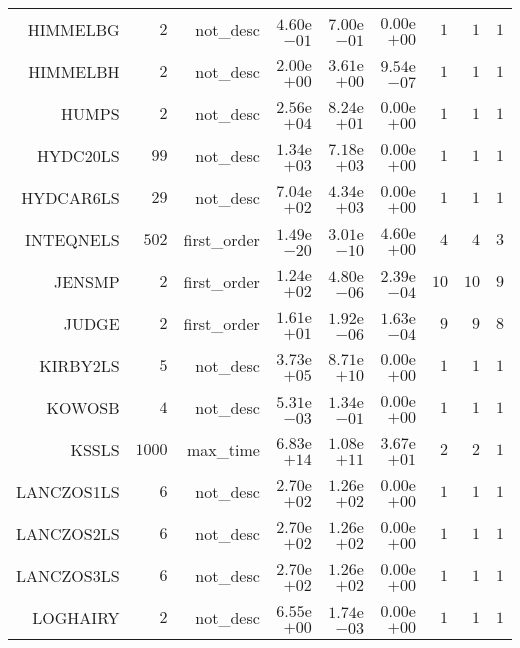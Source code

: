 \begin{longtable}{rrrrrrrrr}
HIMMELBG & \(     2\) & not\_desc & \( 4.60\)e\(-01\) & \( 7.00\)e\(-01\) & \( 0.00\)e\(+00\) & \(     1\) & \(     1\) & \(     1\) \\
HIMMELBH & \(     2\) & not\_desc & \( 2.00\)e\(+00\) & \( 3.61\)e\(+00\) & \( 9.54\)e\(-07\) & \(     1\) & \(     1\) & \(     1\) \\
HUMPS & \(     2\) & not\_desc & \( 2.56\)e\(+04\) & \( 8.24\)e\(+01\) & \( 0.00\)e\(+00\) & \(     1\) & \(     1\) & \(     1\) \\
HYDC20LS & \(    99\) & not\_desc & \( 1.34\)e\(+03\) & \( 7.18\)e\(+03\) & \( 0.00\)e\(+00\) & \(     1\) & \(     1\) & \(     1\) \\
HYDCAR6LS & \(    29\) & not\_desc & \( 7.04\)e\(+02\) & \( 4.34\)e\(+03\) & \( 0.00\)e\(+00\) & \(     1\) & \(     1\) & \(     1\) \\
INTEQNELS & \(   502\) & first\_order & \( 1.49\)e\(-20\) & \( 3.01\)e\(-10\) & \( 4.60\)e\(+00\) & \(     4\) & \(     4\) & \(     3\) \\
JENSMP & \(     2\) & first\_order & \( 1.24\)e\(+02\) & \( 4.80\)e\(-06\) & \( 2.39\)e\(-04\) & \(    10\) & \(    10\) & \(     9\) \\
JUDGE & \(     2\) & first\_order & \( 1.61\)e\(+01\) & \( 1.92\)e\(-06\) & \( 1.63\)e\(-04\) & \(     9\) & \(     9\) & \(     8\) \\
KIRBY2LS & \(     5\) & not\_desc & \( 3.73\)e\(+05\) & \( 8.71\)e\(+10\) & \( 0.00\)e\(+00\) & \(     1\) & \(     1\) & \(     1\) \\
KOWOSB & \(     4\) & not\_desc & \( 5.31\)e\(-03\) & \( 1.34\)e\(-01\) & \( 0.00\)e\(+00\) & \(     1\) & \(     1\) & \(     1\) \\
KSSLS & \(  1000\) & max\_time & \( 6.83\)e\(+14\) & \( 1.08\)e\(+11\) & \( 3.67\)e\(+01\) & \(     2\) & \(     2\) & \(     1\) \\
LANCZOS1LS & \(     6\) & not\_desc & \( 2.70\)e\(+02\) & \( 1.26\)e\(+02\) & \( 0.00\)e\(+00\) & \(     1\) & \(     1\) & \(     1\) \\
LANCZOS2LS & \(     6\) & not\_desc & \( 2.70\)e\(+02\) & \( 1.26\)e\(+02\) & \( 0.00\)e\(+00\) & \(     1\) & \(     1\) & \(     1\) \\
LANCZOS3LS & \(     6\) & not\_desc & \( 2.70\)e\(+02\) & \( 1.26\)e\(+02\) & \( 0.00\)e\(+00\) & \(     1\) & \(     1\) & \(     1\) \\
LOGHAIRY & \(     2\) & not\_desc & \( 6.55\)e\(+00\) & \( 1.74\)e\(-03\) & \( 0.00\)e\(+00\) & \(     1\) & \(     1\) & \(     1\) \\

\end{longtable}
